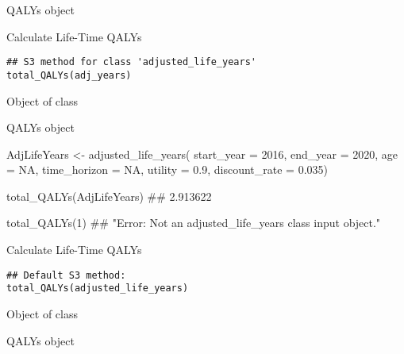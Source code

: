 \documentclass[a4paper]{book}
\begin{document}
%
\begin{Value}
QALYs object
\end{Value}
%
\begin{Description}\relax
Calculate Life-Time QALYs
\end{Description}
%
\begin{Usage}
\begin{verbatim}
## S3 method for class 'adjusted_life_years'
total_QALYs(adj_years)
\end{verbatim}
\end{Usage}
%
\begin{Arguments}
\begin{ldescription}
\item[\code{adjusted\_life\_years}] Object of class 
\end{ldescription}
\end{Arguments}
%
\begin{Value}
QALYs object
\end{Value}
%
\begin{Examples}
\begin{ExampleCode}

AdjLifeYears <- adjusted_life_years(
                    start_year = 2016,
                    end_year = 2020,
                    age = NA,
                    time_horizon = NA,
                    utility = 0.9,
                    discount_rate = 0.035)

total_QALYs(AdjLifeYears)
## 2.913622

total_QALYs(1)
## "Error: Not an adjusted_life_years class input object."

\end{ExampleCode}
\end{Examples}
%
\begin{Description}\relax
Calculate Life-Time QALYs
\end{Description}
%
\begin{Usage}
\begin{verbatim}
## Default S3 method:
total_QALYs(adjusted_life_years)
\end{verbatim}
\end{Usage}
%
\begin{Arguments}
\begin{ldescription}
\item[\code{adjusted\_life\_years}] Object of class 
\end{ldescription}
\end{Arguments}
%
\begin{Value}
QALYs object
\end{Value}
\printindex{}
\end{document}
